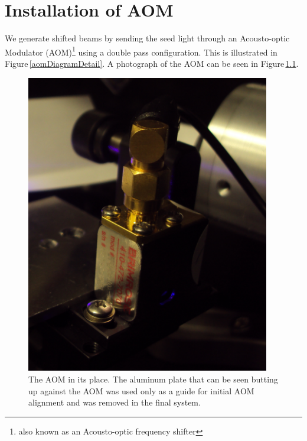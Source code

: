 \chapter{Installation of AOM}\label{AOMInstallChapter}

We generate shifted beams by sending the seed light through an Acousto-optic Modulator (AOM)\footnote{also known as an Acousto-optic frequency shifter} using a double pass configuration. This is illustrated in Figure\,\ref{aomDiagramDetail}. A photograph of the AOM can be seen in Figure\,\ref{aom_upclose}.

\begin{figure}
\centerline{
\includegraphics[width=0.95\textwidth]{aom_upclose.JPG}}
\caption[Photograph of AOM]{\label{aom_upclose} The AOM in its place. The aluminum plate that can be seen butting up against the AOM was used only as a guide for initial AOM alignment and was removed in the final system.}
\end{figure}
